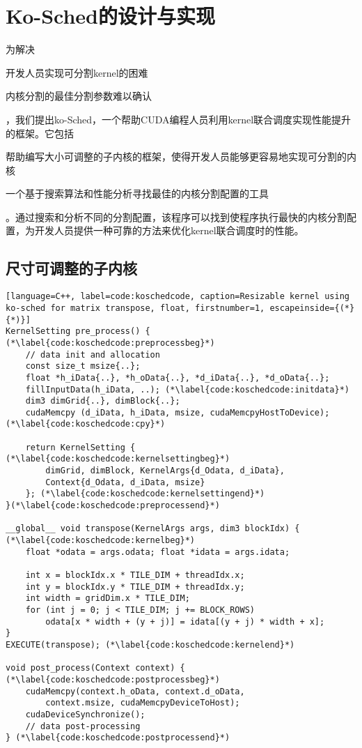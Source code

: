 \chapter{Ko-Sched的设计与实现}\label{chapter:design-implementation}

为解决
\begin{enumerate*}[label=\roman*),itemjoin={\quad}]
    \item 开发人员实现可分割kernel的困难
    \item 内核分割的最佳分割参数难以确认
\end{enumerate*}
，我们提出ko-Sched，一个帮助CUDA编程人员利用kernel联合调度实现性能提升的框架。它包括
\begin{enumerate*}[label=\roman*),itemjoin={\quad}]
    \item 帮助编写大小可调整的子内核的框架，使得开发人员能够更容易地实现可分割的内核
    \item 一个基于搜索算法和性能分析寻找最佳的内核分割配置的工具
\end{enumerate*}
。通过搜索和分析不同的分割配置，该程序可以找到使程序执行最快的内核分割配置，为开发人员提供一种可靠的方法来优化kernel联合调度时的性能。

\section{尺寸可调整的子内核}

\begin{lstlisting}[language=C++, label=code:koschedcode, caption=Resizable kernel using ko-sched for matrix transpose, float, firstnumber=1, escapeinside={(*}{*)}]
KernelSetting pre_process() { (*\label{code:koschedcode:preprocessbeg}*)
    // data init and allocation
    const size_t msize{..};
    float *h_iData{..}, *h_oData{..}, *d_iData{..}, *d_oData{..};
    fillInputData(h_iData, ..); (*\label{code:koschedcode:initdata}*)
    dim3 dimGrid{..}, dimBlock{..};
    cudaMemcpy (d_iData, h_iData, msize, cudaMemcpyHostToDevice); (*\label{code:koschedcode:cpy}*)

    return KernelSetting { (*\label{code:koschedcode:kernelsettingbeg}*)
        dimGrid, dimBlock, KernelArgs{d_Odata, d_iData}, 
        Context{d_Odata, d_iData, msize}
    }; (*\label{code:koschedcode:kernelsettingend}*)
}(*\label{code:koschedcode:preprocessend}*)

__global__ void transpose(KernelArgs args, dim3 blockIdx) { (*\label{code:koschedcode:kernelbeg}*)
    float *odata = args.odata; float *idata = args.idata;

    int x = blockIdx.x * TILE_DIM + threadIdx.x;
    int y = blockIdx.y * TILE_DIM + threadIdx.y;
    int width = gridDim.x * TILE_DIM;
    for (int j = 0; j < TILE_DIM; j += BLOCK_ROWS)
        odata[x * width + (y + j)] = idata[(y + j) * width + x];
}
EXECUTE(transpose); (*\label{code:koschedcode:kernelend}*)

void post_process(Context context) { (*\label{code:koschedcode:postprocessbeg}*)
    cudaMemcpy(context.h_oData, context.d_oData, 
        context.msize, cudaMemcpyDeviceToHost);
    cudaDeviceSynchronize();
    // data post-processing
} (*\label{code:koschedcode:postprocessend}*)
\end{lstlisting}

